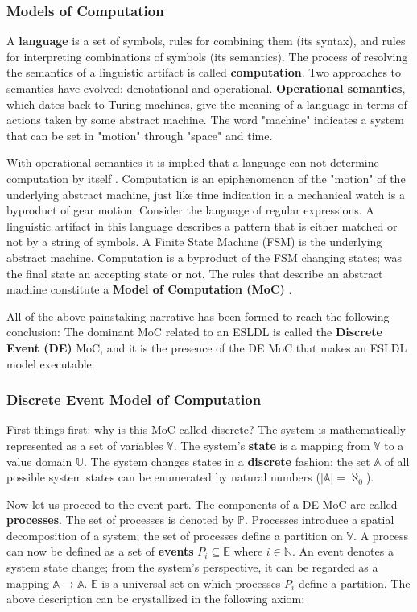 \documentclass[11pt]{article}
\begin{document}
\subsubsection{Models of Computation}
\label{sec:org39b630e}
A \textbf{language} is a set of symbols, rules for combining them (its syntax), and rules for interpreting combinations of symbols (its semantics). 
The process of resolving the semantics of a linguistic artifact is called \textbf{computation}.
Two approaches to semantics have evolved: denotational and operational.
\textbf{Operational semantics}, which dates back to Turing machines, give the meaning of a language in terms of actions taken by some abstract machine. 
The word "machine" indicates a system that can be set in "motion" through "space" and time.

With operational semantics it is implied that a language can not determine computation by itself \cite{Jantsch2005}. 
Computation is an epiphenomenon of the "motion" of the underlying abstract machine, just like time indication in a mechanical watch is a byproduct of gear motion.
Consider the language of regular expressions.
A linguistic artifact in this language describes a pattern that is either matched or not by a string of symbols.
A Finite State Machine (FSM) is the underlying abstract machine.
Computation is a byproduct of the FSM changing states; was the final state an accepting state or not.
The rules that describe an abstract machine constitute a \textbf{Model of Computation (MoC)} \cite{Edwards1997}.

All of the above painstaking narrative has been formed to reach the following conclusion: 
The dominant MoC related to an ESLDL is called the \textbf{Discrete Event (DE)} MoC, and it is the presence of the DE MoC that makes an ESLDL model executable.

\subsubsection{Discrete Event Model of Computation}
\label{sec:org2eb9199}
First things first: why is this MoC called discrete?
The system is mathematically represented as a set of variables \(\mathds{V}\).
The system's \textbf{state} is a mapping from \(\mathds{V}\) to a value domain \(\mathds{U}\).
The system changes states in a \textbf{discrete} fashion; 
the set \(\mathds{A}\) of all possible system states can be enumerated by natural numbers (\(|\mathds{A}| = \aleph_0\)).

Now let us proceed to the event part.
The components of a DE MoC are called \textbf{processes}.
The set of processes is denoted by \(\mathbb{P}\).
Processes introduce a spatial decomposition of a system; the set of processes define a partition on \(\mathds{V}\).
A process can now be defined as a set of \textbf{events} \(P_i \subseteq \mathds{E}\) where \(i\in\mathbb{N}\).
An event denotes a system state change; from the system's perspective, it can be regarded as a mapping \(\mathds{A} \rightarrow \mathds{A}\).
\(\mathds{E}\) is a universal set on which processes \(P_i\) define a partition.
The above description can be crystallized in the following axiom:
\end{document}
